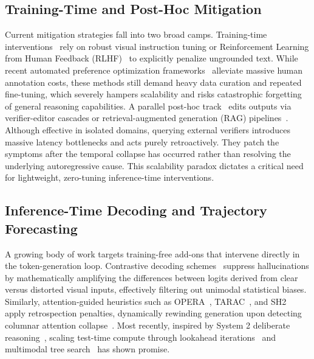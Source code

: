 \subsection{Training-Time and Post-Hoc Mitigation}

Current mitigation strategies fall into two broad camps. Training-time interventions~\cite{liu2023aligning,lee2024volcano,anonymous2025_re_critic,yu2024rlhfv,sun2023llava_rlhf} rely on robust visual instruction tuning or Reinforcement Learning from Human Feedback (RLHF)~\cite{sun2023llava_rlhf,yu2024rlhfv,peng2025sentinel} to explicitly penalize ungrounded text. While recent automated preference optimization frameworks~\cite{peng2025sentinel,anonymous2026_iris} alleviate massive human annotation costs, these methods still demand heavy data curation and repeated fine-tuning, which severely hampers scalability and risks catastrophic forgetting of general reasoning capabilities. A parallel post-hoc track~\cite{yin2023woodpecker,anonymous2024_code,anonymous2024_medthink,abdallah2025hallusearch} edits outputs via verifier-editor cascades or retrieval-augmented generation (RAG) pipelines~\cite{ho2025legal_rag,abdallah2025hallusearch}. Although effective in isolated domains, querying external verifiers introduces massive latency bottlenecks and acts purely retroactively. They patch the symptoms after the temporal collapse has occurred rather than resolving the underlying autoregressive cause. This scalability paradox dictates a critical need for lightweight, zero-tuning inference-time interventions.

\subsection{Inference-Time Decoding and Trajectory Forecasting}

A growing body of work targets training-free add-ons that intervene directly in the token-generation loop. Contrastive decoding schemes~\cite{jiang2024hacl,leng2023mitigating,chuang2023dola,anonymous2025_avcd} suppress hallucinations by mathematically amplifying the differences between logits derived from clear versus distorted visual inputs, effectively filtering out unimodal statistical biases. Similarly, attention-guided heuristics such as OPERA~\cite{huang2024opera_cvpr}, TARAC~\cite{xu2025tarac}, and SH2~\cite{kai2024sh2} apply retrospection penalties, dynamically rewinding generation upon detecting columnar attention collapse~\cite{huang2024opera_cvpr,anonymous2025_causalmm}. Most recently, inspired by System 2 deliberate reasoning~\cite{anonymous2025_mars2,cheng2025think_more}, scaling test-time compute through lookahead iterations~\cite{fu2024lookahead,gagrani2024speculative_mllm} and multimodal tree search~\cite{zhou2025oagents,gao2024cantor,anonymous2026_rd_vla} has shown promise.

